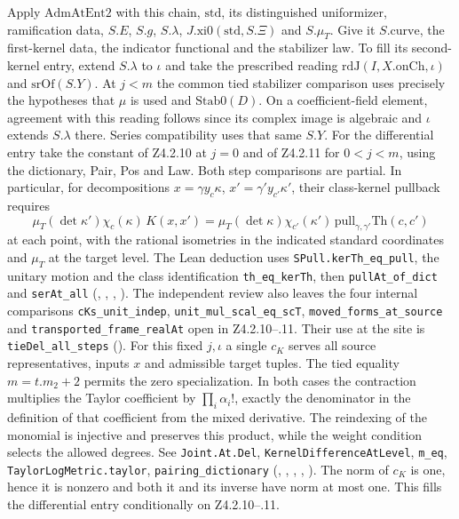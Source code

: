 Apply \(\mathrm{AdmAtEnt2}\) with this chain, \(\mathrm{std}\),
its distinguished uniformizer, ramification data, \(S.E\), \(S.g\),
\(S.\lambda\), \(J.\mathrm{xi0}(\mathrm{std},S.\Xi)\) and \(S.\mu_T\).
Give it \(S.\mathrm{curve}\), the first-kernel data, the indicator
functional and the stabilizer law. To fill its second-kernel entry,
extend \(S.\lambda\) to \(\iota\) and take the prescribed reading
\(\mathrm{rdJ}(I,X.\mathrm{onCh},\iota)\) and
\(\mathrm{srOf}(S.Y)\). At \(j<m\) the common tied stabilizer comparison
uses precisely the hypotheses that \(\mu\) is used and
\(\mathrm{Stab0}(D)\). On a coefficient-field element, agreement with
this reading follows since its complex image is algebraic and \(\iota\)
extends \(S.\lambda\) there. Series compatibility uses that same \(S.Y\).
For the differential entry take the constant of Z4.2.10 at \(j=0\)
and of Z4.2.11 for \(0<j<m\), using the dictionary, Pair, Pos and Law. Both
step comparisons are partial. In particular, for decompositions
\(x=\gamma y_c\kappa\), \(x'=\gamma'y_{c'}\kappa'\), their class-kernel
pullback requires
\[
 \mu_T(\det\kappa')\chi_c(\kappa)\,K(x,x')
  =\mu_T(\det\kappa)\chi_{c'}(\kappa')\,
     \mathrm{pull}_{\gamma,\gamma'}\mathrm{Th}(c,c')
\]
at each point, with the rational isometries in the indicated standard
coordinates and \(\mu_T\) at the target level. The Lean deduction
uses \nolinkurl{SPull.kerTh_eq_pull}, the unitary motion and the class
identification \nolinkurl{th_eq_kerTh}, then
\nolinkurl{pullAt_of_dict} and \nolinkurl{serAt_all}
(,
,
,
).
The independent review also leaves the four internal comparisons
\nolinkurl{cKs_unit_indep}, \nolinkurl{unit_mul_scal_eq_scT},
\nolinkurl{moved_forms_at_source} and \nolinkurl{transported_frame_realAt}
open in Z4.2.10--.11. Their use at the site is
\nolinkurl{tieDel_all_steps}
(). For this fixed \(j,\iota\) a single \(c_K\) serves all
source representatives, inputs \(x\) and admissible target tuples.
The tied equality \(m=t.m_2+2\) permits the zero specialization.
In both cases the contraction multiplies the Taylor coefficient by
\(\prod_i\alpha_i!\), exactly the denominator in the definition of
that coefficient from the mixed derivative. The reindexing of the
monomial is injective and preserves this product, while the weight
condition selects the allowed degrees. See \nolinkurl{Joint.At.Del},
\nolinkurl{KernelDifferenceAtLevel}, \nolinkurl{m_eq},
\nolinkurl{TaylorLogMetric.taylor}, \nolinkurl{pairing_dictionary}
(,
,
,
,
).
The norm of \(c_K\) is one, hence it is nonzero and both it and its
inverse have norm at most one. This fills the differential entry
conditionally on Z4.2.10--.11.

